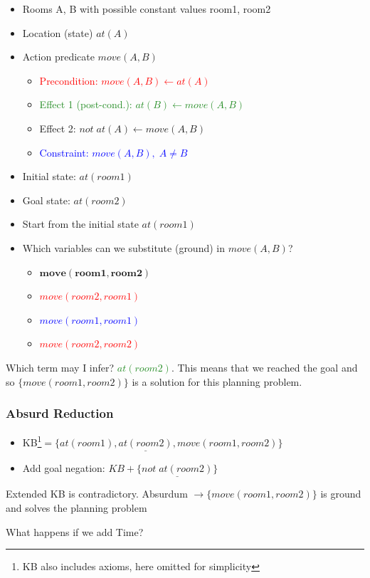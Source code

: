 \begin{minipage}[t]{0.5\textwidth}
    \begin{itemize}
        \item Rooms A, B with possible constant values room1, room2
        \item Location (state) $at(A)$
        \item Action predicate $move(A, B)$
        \begin{itemize}
            \item \textcolor{red}{Precondition: $move(A, B) \leftarrow at(A)$}
            \item \textcolor{ForestGreen}{Effect 1 (post-cond.): $at(B) \leftarrow move(A, B)$}
            \item Effect 2: $not\;at(A) \leftarrow move(A, B)$
            \item \textcolor{blue}{Constraint: $move(A, B),\;A \ne B$}
        \end{itemize}
        \item Initial state: $at(room1)$
        \item Goal state: $at(room2)$
    \end{itemize}
\end{minipage}
\begin{minipage}[t]{0.8\textwidth}
    \begin{itemize}
        \item Start from the initial state $at(room1)$
        \item Which variables can we substitute (ground) in $move(A, B)$?
        \begin{itemize}
            \item $\bm{move(room1, room2)}$
            \item \textcolor{red}{\st{$move(room2, room1)$}}
            \item \textcolor{blue}{\st{$move(room1, room1)$}}
            \item \textcolor{red}{\st{$move(room2, room2)$}}
        \end{itemize}
    \end{itemize}
\end{minipage}
\vspace{0.1cm}

Which term may I infer? \textcolor{ForestGreen}{$at(room2)$}. This means that we reached the goal and so
$\{move(room1,room2)\}$ is a solution for this planning problem.

\subsubsection*{Absurd Reduction}
\begin{itemize}
    \item KB\footnote{KB also includes axioms, here omitted for simplicity}$=\{at(room1), \underline{at(room2)}, move(room1,room2)\}$
    \item Add goal negation: $KB + \{\underline{not\;at(room2)}\}$
\end{itemize}
Extended KB is contradictory.
Absurdum $\rightarrow \{move(room1,room2)\}$ is ground and solves the planning problem

What happens if we add Time?
